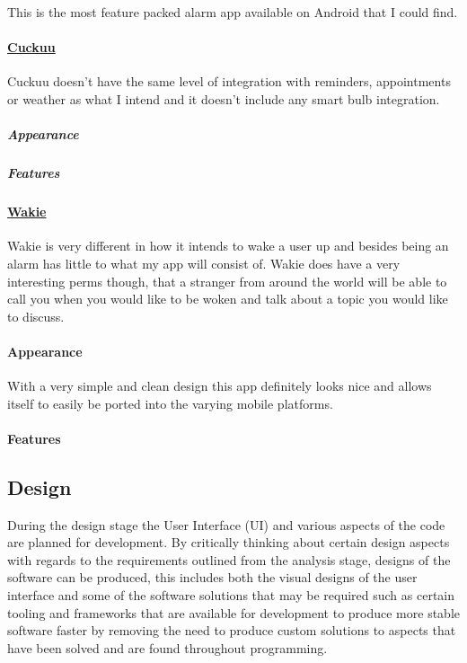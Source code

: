 This is the most feature packed alarm app available on Android that I
could find.

\paragraph{\texorpdfstring{\href{https://cuckuu.com/}{Cuckuu}}{Cuckuu}}\label{cuckuu}

Cuckuu doesn't have the same level of integration with reminders,
appointments or weather as what I intend and it doesn't include any
smart bulb integration.

\subparagraph{Appearance}\label{appearance}

\subparagraph{Features}\label{features}

\paragraph{\texorpdfstring{\href{https://wakie.com/}{Wakie}}{Wakie}}\label{wakie}

Wakie is very different in how it intends to wake a user up and besides
being an alarm has little to what my app will consist of. Wakie does
have a very interesting perms though, that a stranger from around the
world will be able to call you when you would like to be woken and talk
about a topic you would like to discuss.

\paragraph{Appearance}\label{appearance-1}

With a very simple and clean design this app definitely looks nice and
allows itself to easily be ported into the varying mobile platforms.

\paragraph{Features}\label{features-1}

\subsection{Design}\label{design}

During the design stage the User Interface (UI) and various aspects of
the code are planned for development. By critically thinking about
certain design aspects with regards to the requirements outlined from
the analysis stage, designs of the software can be produced, this
includes both the visual designs of the user interface and some of the
software solutions that may be required such as certain tooling and
frameworks that are available for development to produce more stable
software faster by removing the need to produce custom solutions to
aspects that have been solved and are found throughout programming.

